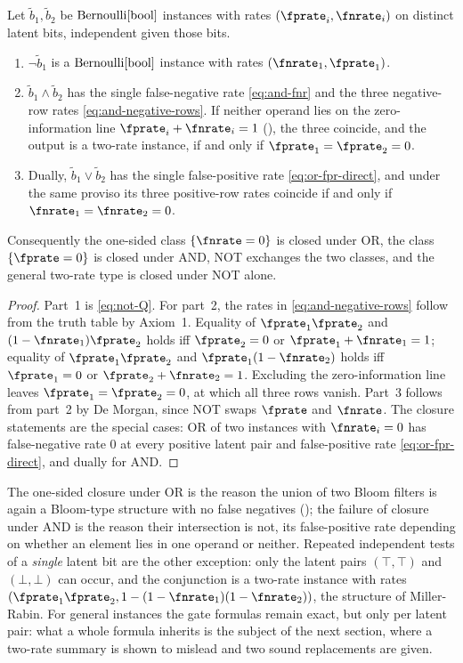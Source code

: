\begin{proposition}
\label{prop:boolean-closure}
Let $\tilde{b}_1, \tilde{b}_2$ be $\mathrm{Bernoulli}[\mathrm{bool}]$ instances with rates
$(\fprate_i, \fnrate_i)$ on distinct latent bits, independent given those bits.
\begin{enumerate}
  \item $\neg \tilde{b}_1$ is a $\mathrm{Bernoulli}[\mathrm{bool}]$ instance with rates
    $(\fnrate_1, \fprate_1)$.
  \item $\tilde{b}_1 \wedge \tilde{b}_2$ has the single false-negative rate
    \eqref{eq:and-fnr} and the three negative-row rates
    \eqref{eq:and-negative-rows}. If neither operand lies on the
    zero-information line $\fprate_i + \fnrate_i = 1$
    (), the three coincide, and the output is a
    two-rate instance, if and only if $\fprate_1 = \fprate_2 = 0$.
  \item Dually, $\tilde{b}_1 \vee \tilde{b}_2$ has the single false-positive rate
    \eqref{eq:or-fpr-direct}, and under the same proviso its three positive-row
    rates coincide if and only if $\fnrate_1 = \fnrate_2 = 0$.
\end{enumerate}
Consequently the one-sided class $\{\fnrate = 0\}$ is closed under OR, the class
$\{\fprate = 0\}$ is closed under AND, NOT exchanges the two classes, and the
general two-rate type is closed under NOT alone.
\end{proposition}

\begin{proof}
Part~1 is \eqref{eq:not-Q}. For part~2, the rates in \eqref{eq:and-negative-rows}
follow from the truth table by Axiom~1. Equality of $\fprate_1 \fprate_2$ and
$(1 - \fnrate_1)\fprate_2$ holds iff $\fprate_2 = 0$ or $\fprate_1 + \fnrate_1 =
1$; equality of $\fprate_1 \fprate_2$ and $\fprate_1(1 - \fnrate_2)$ holds iff
$\fprate_1 = 0$ or $\fprate_2 + \fnrate_2 = 1$. Excluding the zero-information
line leaves $\fprate_1 = \fprate_2 = 0$, at which all three rows vanish. Part~3
follows from part~2 by De Morgan, since NOT swaps $\fprate$ and $\fnrate$. The
closure statements are the special cases: OR of two instances with $\fnrate_i =
0$ has false-negative rate $0$ at every positive latent pair and false-positive
rate \eqref{eq:or-fpr-direct}, and dually for AND.
\end{proof}

The one-sided closure under OR is the reason the union of two Bloom filters is
again a Bloom-type structure with no false negatives
(); the failure of closure under AND is the reason
their intersection is not, its false-positive rate depending on whether an
element lies in one operand or neither. Repeated independent tests of a
\emph{single} latent bit are the other exception: only the latent pairs
$(\top, \top)$ and $(\bot, \bot)$ can occur, and the conjunction is a two-rate
instance with rates $(\fprate_1 \fprate_2, 1 - (1 - \fnrate_1)(1 -
\fnrate_2))$, the structure of Miller-Rabin. For general instances the gate formulas
remain exact, but only per latent pair: what a whole formula inherits is the
subject of the next section, where a two-rate summary is shown to mislead and
two sound replacements are given.
